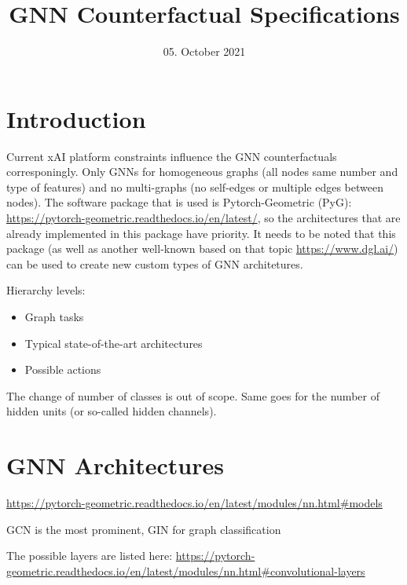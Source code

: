 \documentclass[12p3, letterpaper, twoside]{article}
\title{GNN Counterfactual Specifications}
\date{05. October 2021}
\begin{document}
\begin{titlepage}
\maketitle
\end{titlepage}

\section{Introduction}

Current xAI platform constraints influence the GNN counterfactuals corresponingly. Only GNNs for homogeneous graphs (all nodes same number and type of features) and no multi-graphs (no self-edges or multiple edges between nodes). The software package that is used is 
Pytorch-Geometric (PyG):\\ 
\url{https://pytorch-geometric.readthedocs.io/en/latest/}, so the architectures that are already implemented in this package have priority. It needs to be noted that this package (as well as another well-known based on that topic \url{https://www.dgl.ai/}) can be used to create new custom types of GNN architetures. 

Hierarchy levels:

\begin{itemize}
	\item Graph tasks
	\item Typical state-of-the-art architectures
	\item Possible actions
\end{itemize}

The change of number of classes is out of scope. Same goes for the number of hidden units (or so-called hidden channels).

\section{GNN Architectures}

\url{https://pytorch-geometric.readthedocs.io/en/latest/modules/nn.html#models}

GCN is the most prominent, GIN for graph classification

The possible layers are listed here: \url{https://pytorch-geometric.readthedocs.io/en/latest/modules/nn.html#convolutional-layers}

\end{document}
